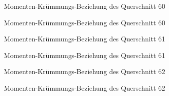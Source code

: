 \documentclass[
  11pt,
  letterpaper,
]{scrreprt}
\begin{document}
\begin{figure}[H]


\caption{\label{fig-qs_60}Momenten-Krümmungs-Beziehung des Querschnitt
60}

\end{figure}%

\begin{figure}[H]


\caption{\label{fig-m_chi_60}Momenten-Krümmungs-Beziehung des
Querschnitt 60}

\end{figure}%

\begin{figure}[H]


\caption{\label{fig-qs_61}Momenten-Krümmungs-Beziehung des Querschnitt
61}

\end{figure}%

\begin{figure}[H]


\caption{\label{fig-m_chi_61}Momenten-Krümmungs-Beziehung des
Querschnitt 61}

\end{figure}%

\begin{figure}[H]


\caption{\label{fig-qs_62}Momenten-Krümmungs-Beziehung des Querschnitt
62}

\end{figure}%

\begin{figure}[H]


\caption{\label{fig-m_chi_62}Momenten-Krümmungs-Beziehung des
Querschnitt 62}

\end{figure}%
\end{document}
